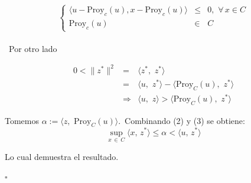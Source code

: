 \[\left\{ \begin{array}{rcl}
            \langle u - \mbox{Proy}_c (u), x -  \mbox{Proy}_c (u) \rangle & \leqslant & 0,\,\,
            \forall \, x  \in C\\
            \mbox{Proy}_c (u)   & \in & C
          \end{array}
\right. \]
\\ 
\
Por otro lado 

\begin{eqnarray}
      0 < \parallel z^*\parallel^2 & = & \langle z^*, \,\,z^* \rangle \nonumber \\
      & = &  \langle u, \,\,z^* \rangle - \langle \mbox{Proy}_{C}(u), \,\,z^* \rangle \\
      & \Longrightarrow & \langle u, \,\, z \rangle > \langle \mbox{Proy}_{C}(u), \,\,z^* \rangle
\end{eqnarray}

Tomemos $\alpha:= \langle z, \,\, \mbox{Proy}_{C}(u) \rangle.$\, Combinando (2) y (3) se obtiene:
\[ \sup_{x\, \in \, C} \langle x, \, z^*  \rangle  \leqslant \alpha < \langle u, \, z^{*} \rangle\]

Lo cual demuestra el resultado. \begin{flushright}
                                   $\square$
                                \end{flushright}















